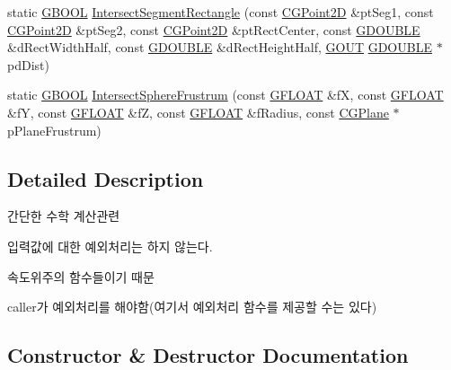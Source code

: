 \begin{DoxyCompactItemize}
\item 
static \hyperlink{_g_types_8h_a2901915743626352a6820c5405f556dc}{G\+B\+O\+O\+L} \hyperlink{class_c_g_math_a5fa56b2057978eadfc65cd38221f944b}{Intersect\+Segment\+Rectangle} (const \hyperlink{class_c_g_point2_d}{C\+G\+Point2\+D} \&pt\+Seg1, const \hyperlink{class_c_g_point2_d}{C\+G\+Point2\+D} \&pt\+Seg2, const \hyperlink{class_c_g_point2_d}{C\+G\+Point2\+D} \&pt\+Rect\+Center, const \hyperlink{_g_types_8h_afd05ac85f90ee8e2a733928545462cd4}{G\+D\+O\+U\+B\+L\+E} \&d\+Rect\+Width\+Half, const \hyperlink{_g_types_8h_afd05ac85f90ee8e2a733928545462cd4}{G\+D\+O\+U\+B\+L\+E} \&d\+Rect\+Height\+Half, \hyperlink{_g_types_8h_a0858ec221262e635612871d70ca233ad}{G\+O\+U\+T} \hyperlink{_g_types_8h_afd05ac85f90ee8e2a733928545462cd4}{G\+D\+O\+U\+B\+L\+E} $\ast$pd\+Dist)
\item 
static \hyperlink{_g_types_8h_a2901915743626352a6820c5405f556dc}{G\+B\+O\+O\+L} \hyperlink{class_c_g_math_ad6b210102d8c83899a268b87da18139f}{Intersect\+Sphere\+Frustrum} (const \hyperlink{_g_types_8h_abf6eba8223df62f199b811a6c52ff2ef}{G\+F\+L\+O\+A\+T} \&f\+X, const \hyperlink{_g_types_8h_abf6eba8223df62f199b811a6c52ff2ef}{G\+F\+L\+O\+A\+T} \&f\+Y, const \hyperlink{_g_types_8h_abf6eba8223df62f199b811a6c52ff2ef}{G\+F\+L\+O\+A\+T} \&f\+Z, const \hyperlink{_g_types_8h_abf6eba8223df62f199b811a6c52ff2ef}{G\+F\+L\+O\+A\+T} \&f\+Radius, const \hyperlink{class_c_g_plane}{C\+G\+Plane} $\ast$p\+Plane\+Frustrum)
\end{DoxyCompactItemize}


\subsection{Detailed Description}

\begin{DoxyItemize}
\item 간단한 수학 계산관련
\item 입력값에 대한 예외처리는 하지 않는다.
\begin{DoxyItemize}
\item 속도위주의 함수들이기 때문
\item caller가 예외처리를 해야함(여기서 예외처리 함수를 제공할 수는 있다) 
\end{DoxyItemize}
\end{DoxyItemize}

\subsection{Constructor \& Destructor Documentation}
\hypertarget{class_c_g_math_a349fb12012c0328af792a972aeba4447}{}
